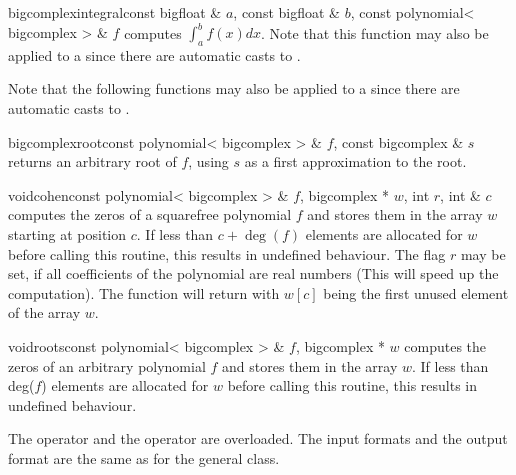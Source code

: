 \begin{fcode}{bigcomplex}{integral}{const bigfloat & $a$, const bigfloat & $b$, const polynomial< bigcomplex > & $f$}
  computes $\int_a^bf(x)dx$.  Note that this function may also be applied to a  since there are automatic casts to .
\end{fcode}




Note that the following functions may also be applied to a  since there
are automatic casts to .

\begin{fcode}{bigcomplex}{root}{const polynomial< bigcomplex > & $f$, const bigcomplex & $s$}
  returns an arbitrary root of $f$, using $s$ as a first approximation to the root.
\end{fcode}

\begin{fcode}{void}{cohen}{const polynomial< bigcomplex > & $f$, bigcomplex * $w$, int $r$, int & $c$}
  computes the zeros of a squarefree polynomial $f$ and stores them in the array $w$ starting at
  position $c$.  If less than $c + \deg(f)$ elements are allocated for $w$ before calling this
  routine, this results in undefined behaviour.  The flag $r$ may be set, if all coefficients of
  the polynomial are real numbers (This will speed up the computation).  The function will
  return with $w[c]$ being the first unused element of the array $w$.
\end{fcode}

\begin{fcode}{void}{roots}{const polynomial< bigcomplex > & $f$, bigcomplex * $w$}
  computes the zeros of an arbitrary polynomial $f$ and stores them in the array $w$.  If less
  than deg($f$) elements are allocated for $w$ before calling this routine, this results in
  undefined behaviour.
\end{fcode}



\IO

The  operator \code{>>} and the  operator \code{<<} are overloaded.
The input formats and the output format are the same as for the general class.


